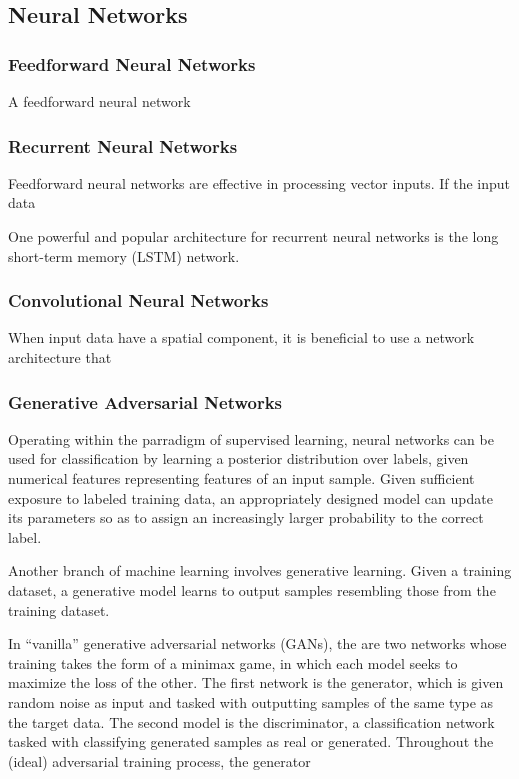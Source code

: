\documentclass[12pt,leqno,a4paper]{article}
\begin{document}
\subsubsection{}

\subsection{Neural Networks}
\subsubsection{Feedforward Neural Networks}
A feedforward neural network 

\subsubsection{Recurrent Neural Networks}
Feedforward neural networks are effective in processing vector inputs. If the input 
data

One powerful and popular architecture for recurrent neural networks is the long
short-term memory (LSTM) network.

\subsubsection{Convolutional Neural Networks}
When input data have a spatial component, it is beneficial to use a network architecture 
that 

\subsubsection{Generative Adversarial Networks}
Operating within the parradigm of supervised learning, neural networks
can be used for classification by learning a posterior distribution over 
labels, given numerical features representing features of an input sample.
Given sufficient exposure to labeled training data, an appropriately designed 
model can update its parameters so as to assign an increasingly larger probability
to the correct label.

Another branch of machine learning involves generative learning. Given a training dataset,
a generative model learns to output samples resembling those from the training dataset. 

In ``vanilla'' generative adversarial networks (GANs), the are two networks whose training 
takes the form of a minimax game, in which each model seeks to maximize the loss of the other.
The first network is the generator, which is given random noise as input and tasked with 
outputting samples of the same type as the target data. The second model is the discriminator,
a classification network tasked with classifying generated samples as real or generated. 
Throughout the (ideal) adversarial training process, the generator 
\end{document}
